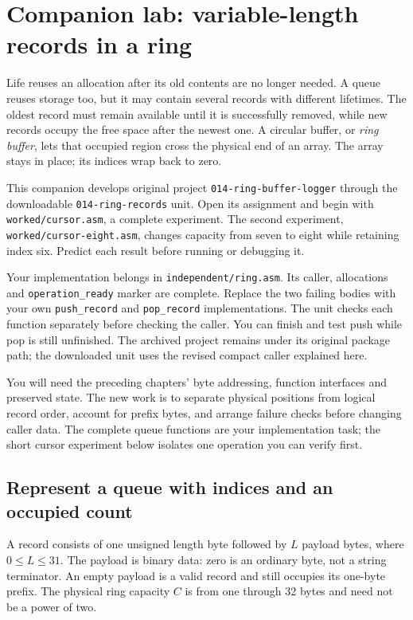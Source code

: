 \section{Companion lab: variable-length records in a ring}
\label{revision-lab:ring-buffer}

Life reuses an allocation after its old contents are no longer needed. A queue
reuses storage too, but it may contain several records with different lifetimes.
The oldest record must remain available until it is successfully removed, while
new records occupy the free space after the newest one. A circular buffer, or
\emph{ring buffer}, lets that occupied region cross the physical end of an array.
The array stays in place; its indices wrap back to zero.

This companion develops original project \texttt{014-ring-buffer-logger} through
the downloadable \texttt{014-ring-records} unit. Open its assignment and begin with
\texttt{worked/cursor.asm}, a complete experiment. The second experiment,
\texttt{worked/cursor-eight.asm}, changes capacity from seven to eight while
retaining index six. Predict each result before running or debugging it.

Your implementation belongs in \texttt{independent/ring.asm}. Its caller,
allocations and \texttt{operation\_ready} marker are complete. Replace the two
failing bodies with your own \texttt{push\_record} and \texttt{pop\_record}
implementations. The unit checks each function separately before checking the
caller. You can finish and test push while pop is still unfinished. The archived
project remains under its original package path; the downloaded unit uses the
revised compact caller explained here.

You will need the preceding chapters' byte addressing, function interfaces and
preserved state. The new work is to separate physical positions from logical
record order, account for prefix bytes, and arrange failure checks before changing
caller data. The complete queue functions are your implementation task; the short
cursor experiment below isolates one operation you can verify first.

\subsection*{Represent a queue with indices and an occupied count}

A record consists of one unsigned length byte followed by $L$ payload bytes, where
$0\leq L\leq31$. The payload is binary data: zero is an ordinary byte, not a string
terminator. An empty payload is a valid record and still occupies its one-byte
prefix. The physical ring capacity $C$ is from one through 32 bytes and need not
be a power of two.

